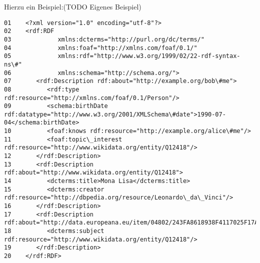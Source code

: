 Hierzu ein Beispiel:(TODO Eigenes Beispiel)\\
\begin{lstlisting}[caption={Beispiel RDF Elemente\protect\footnotemark}]
01    <?xml version="1.0" encoding="utf-8"?>
02    <rdf:RDF
03             xmlns:dcterms="http://purl.org/dc/terms/"
04             xmlns:foaf="http://xmlns.com/foaf/0.1/"
05             xmlns:rdf="http://www.w3.org/1999/02/22-rdf-syntax-ns\#"
06             xmlns:schema="http://schema.org/">
07       <rdf:Description rdf:about="http://example.org/bob\#me">
08          <rdf:type rdf:resource="http://xmlns.com/foaf/0.1/Person"/>
09          <schema:birthDate rdf:datatype="http://www.w3.org/2001/XMLSchema\#date">1990-07-04</schema:birthDate>
10          <foaf:knows rdf:resource="http://example.org/alice\#me"/>
11          <foaf:topic\_interest rdf:resource="http://www.wikidata.org/entity/Q12418"/>
12       </rdf:Description>
13       <rdf:Description rdf:about="http://www.wikidata.org/entity/Q12418">
14          <dcterms:title>Mona Lisa</dcterms:title>
15          <dcterms:creator rdf:resource="http://dbpedia.org/resource/Leonardo\_da\_Vinci"/>
16       </rdf:Description>
17       <rdf:Description rdf:about="http://data.europeana.eu/item/04802/243FA8618938F4117025F17A8B813C5F9AA4D619">
18          <dcterms:subject rdf:resource="http://www.wikidata.org/entity/Q12418"/>
19       </rdf:Description>
20    </rdf:RDF>
\end{lstlisting}
